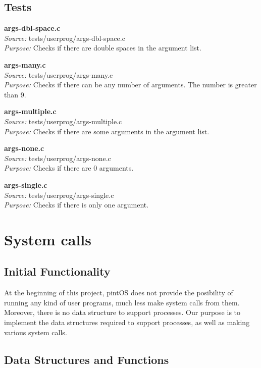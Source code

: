     \subsection{Tests}

      \textbf{args-dbl-space.c}\\
      \textit{Source:} tests/userprog/args-dbl-space.c\\
      \textit{Purpose:} Checks if there are double spaces 
	  in the argument list.


      \textbf{args-many.c}\\
      \textit{Source:} tests/userprog/args-many.c\\
      \textit{Purpose:} Checks if there can be any number of arguments. 
	  The number is greater than 9.

    \textbf{args-multiple.c} \\
    \textit{Source:} tests/userprog/args-multiple.c\\
    \textit{Purpose:} Checks if there are some arguments in 
	  the argument list.

    \textbf{args-none.c}\\
    \textit{Source:} tests/userprog/args-none.c\\
    \textit{Purpose:} Checks if there are 0 arguments.

    \textbf{args-single.c}\\
    \textit{Source:} tests/userprog/args-single.c\\
    \textit{Purpose:} Checks if there is only one argument.\\
    
\section{System calls}

    \subsection{Initial Functionality}

	At the beginning of this project, pintOS does not provide the posibility of running any kind of user programs, much less make system calls from them. Moreover, there is no data structure to support processes. Our purpose is to implement the data structures required to support processes, as well as making various system calls.
  
    \subsection{Data Structures and Functions}


